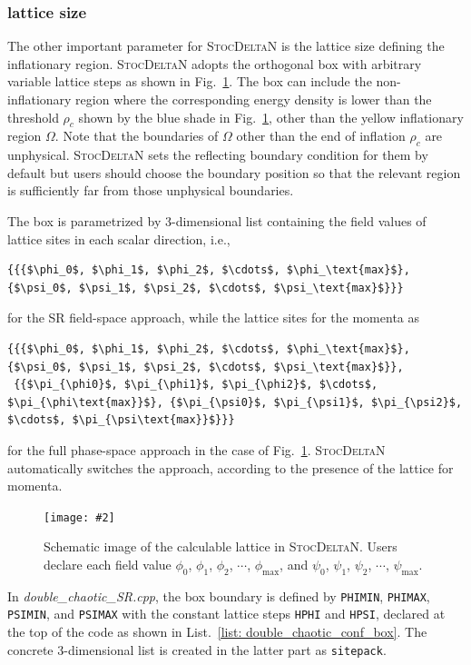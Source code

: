 \documentclass[aps, prd
, preprint
, nofootinbib 
, notitlepage
, superscriptaddress
, longbibliography
]{revtex4-1}
\newcommand{\bfe}[4]{
\begin{figure} 
	\centering
	\texttt{[image: \#2]}
	\caption{#3}
	\label{#4}
\end{figure}}
\begin{document}
\subsubsection{lattice size}

The other important parameter for \textsc{StocDeltaN} is the lattice size defining the inflationary region.
\textsc{StocDeltaN} adopts the orthogonal box with arbitrary variable lattice steps as shown in Fig.~\ref{fig: box}.
The box can include the non-inflationary region where the corresponding energy density is lower than the threshold $\rho_c$
shown by the blue shade in Fig.~\ref{fig: box}, other than the yellow inflationary region $\Omega$.
Note that the boundaries of $\Omega$ other than the end of inflation $\rho_c$ are unphysical. \textsc{StocDeltaN} sets the reflecting boundary condition for them by default but users should choose the boundary position so that the relevant region is sufficiently far from those unphysical boundaries.

The box is parametrized by 3-dimensional list containing the field values of lattice sites in each scalar direction, i.e.,
\begin{lstlisting}[numbers = none, mathescape]
{{{$\phi_0$, $\phi_1$, $\phi_2$, $\cdots$, $\phi_\text{max}$}, {$\psi_0$, $\psi_1$, $\psi_2$, $\cdots$, $\psi_\text{max}$}}}
\end{lstlisting}
for the SR field-space approach, while the lattice sites for the momenta as
\begin{lstlisting}[numbers = none, mathescape]
{{{$\phi_0$, $\phi_1$, $\phi_2$, $\cdots$, $\phi_\text{max}$}, {$\psi_0$, $\psi_1$, $\psi_2$, $\cdots$, $\psi_\text{max}$}},
 {{$\pi_{\phi0}$, $\pi_{\phi1}$, $\pi_{\phi2}$, $\cdots$, $\pi_{\phi\text{max}}$}, {$\pi_{\psi0}$, $\pi_{\psi1}$, $\pi_{\psi2}$, $\cdots$, $\pi_{\psi\text{max}}$}}}
\end{lstlisting}
for the full phase-space approach
in the case of Fig.~\ref{fig: box}.
\textsc{StocDeltaN} automatically switches the approach, according to the presence of the lattice for momenta.

\bfe{width=0.9\hsize}{figs/box.pdf}{Schematic image of the calculable lattice in \textsc{StocDeltaN}. Users declare each field value 
$\phi_0$, $\phi_1$, $\phi_2$, $\cdots$, $\phi_\text{max}$, and $\psi_0$, $\psi_1$, $\psi_2$, $\cdots$, $\psi_\text{max}$.}{fig: box}

In \textit{double\_chaotic\_SR.cpp}, the box boundary is defined by \texttt{PHIMIN}, \texttt{PHIMAX}, \texttt{PSIMIN}, and \texttt{PSIMAX}
with the constant lattice steps \texttt{HPHI} and \texttt{HPSI}, declared at the top of the code as shown in List.~\ref{list: double_chaotic_conf_box}.
The concrete 3-dimensional list is created in the latter part as \texttt{sitepack}.
\end{document}
